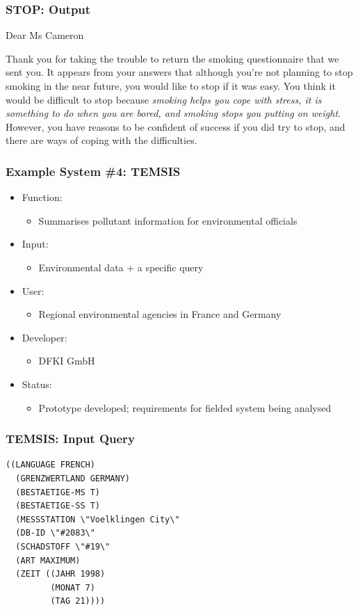 \documentclass[compress,color=usenames]{beamer}
\begin{document}
\begin{frame}
\frametitle{STOP: Output}

 { {{Dear Ms Cameron}}}

 { {Thank you for taking the trouble to return the smoking questionnaire that we sent you. It appears from your answers that although you're not planning to stop smoking in the near future, you would like to stop if it was easy. You think it would be difficult to stop because \textit{smoking helps you cope with stress, it is something to do when you are bored, and smoking stops you putting on weight}. However, you have reasons to be confident of success if you did try to stop, and there are ways of coping with the difficulties. }}

\end{frame}

\begin{frame}
\frametitle{Example System \#4: TEMSIS}

\label{f34}
\begin{itemize}
\item { {Function: }}
\begin{itemize}
\item Summarises pollutant information for environmental officials
\end{itemize}
\item { {Input: }}
\begin{itemize}
\item Environmental data + a specific query
\end{itemize}
\item { {User: }}
\begin{itemize}
\item Regional environmental agencies in France and Germany
\end{itemize}
\item { {Developer: }}
\begin{itemize}
\item DFKI GmbH
\end{itemize}
\item { {Status: }}
\begin{itemize}
\item Prototype developed; requirements for fielded system being analysed
\end{itemize}
\end{itemize}

\end{frame}

\begin{frame}[fragile]
\frametitle{TEMSIS: Input Query}

\begin{verbatim}
((LANGUAGE FRENCH)
  (GRENZWERTLAND GERMANY)
  (BESTAETIGE-MS T)
  (BESTAETIGE-SS T) 
  (MESSSTATION \"Voelklingen City\"
  (DB-ID \"#2083\"
  (SCHADSTOFF \"#19\"
  (ART MAXIMUM)
  (ZEIT ((JAHR 1998)
         (MONAT 7)
         (TAG 21))))
\end{verbatim}


\end{frame}
\end{document}

